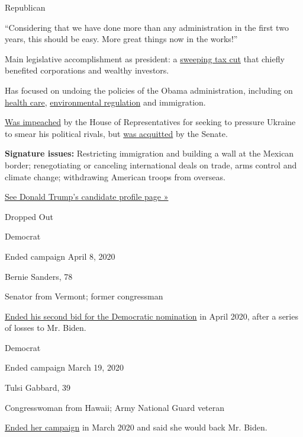 Republican

``Considering that we have done more than any administration in the
first two years, this should be easy. More great things now in the
works!''

Main legislative accomplishment as president: a
\href{https://www.nytimes3xbfgragh.onion/2017/12/22/us/politics/trump-tax-bill.html?module=inline}{sweeping
tax cut} that chiefly benefited corporations and wealthy investors.

Has focused on undoing the policies of the Obama administration,
including on
\href{https://www.nytimes3xbfgragh.onion/interactive/2017/07/19/us/what-trump-can-do-to-let-obamacare-fail.html}{health
care},
\href{https://www.nytimes3xbfgragh.onion/interactive/2018/12/26/us/politics/donald-trump-environmental-regulation.html?module=inline}{environmental
regulation} and immigration.

\href{https://www.nytimes3xbfgragh.onion/2019/12/18/us/politics/trump-impeached.html}{Was
impeached} by the House of Representatives for seeking to pressure
Ukraine to smear his political rivals, but
\href{https://www.nytimes3xbfgragh.onion/2020/02/05/us/politics/trump-acquitted-impeachment.html}{was
acquitted} by the Senate.

\textbf{Signature issues:} Restricting immigration and building a wall
at the Mexican border; renegotiating or canceling international deals on
trade, arms control and climate change; withdrawing American troops from
overseas.

\href{https://www.nytimes3xbfgragh.onion/interactive/2020/us/elections/donald-trump.html}{See
Donald Trump's candidate profile page »}

Dropped Out

Democrat

Ended campaign April 8, 2020

Bernie Sanders, 78

Senator from Vermont; former congressman

\href{https://www.nytimes3xbfgragh.onion/2020/04/08/us/politics/bernie-sanders-drops-out.html}{Ended
his second bid for the Democratic nomination} in April 2020, after a
series of losses to Mr. Biden.

Democrat

Ended campaign March 19, 2020

Tulsi Gabbard, 39

Congresswoman from Hawaii; Army National Guard veteran

\href{https://www.nytimes3xbfgragh.onion/2020/03/19/us/politics/tulsi-gabbard-drops-out.html}{Ended
her campaign} in March 2020 and said she would back Mr. Biden.

